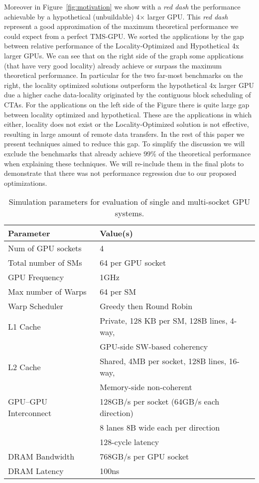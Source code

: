 Moreover in Figure~\ref{fig:motivation} we show with a \emph{red dash} the 
performance achievable by a hypothetical (unbuildable) 4$\times$ larger GPU. 
This \emph{red dash} represent a good approximation of the maximum 
theoretical performance we could expect from a perfect TMS-GPU. We sorted the 
applications by the gap between relative performance of the 
Locality-Optimized and Hypothetical 4x larger GPUs. We can see that on the 
right side of the graph some applications (that have very good locality) 
already achieve or surpass the maximum theoretical performance. In particular 
for the two far-most benchmarks on the right, the locality optimized 
solutions outperform the hypothetical 4x larger GPU due a higher cache 
data-locality originated by the contiguous block scheduling of CTAs. For the 
applications on the left side of the Figure there is quite large gap between 
locality optimized and hypothetical. These are the applications in which 
either, locality does not exist or the Locality-Optimized solution is not 
effective, resulting in large amount of remote data transfers. In the rest of 
this paper we present techniques aimed to reduce this gap. To simplify the 
discussion we will exclude the benchmarks that already achieve 99\% of the 
theoretical performance when explaining these techniques. We will re-include 
them in the final plots to demonstrate that there was not performance 
regression due to our proposed optimizations. 

\begin{table}[tp]
\begin{small}
\centering
\begin{tabular}{ll}
\toprule
\textbf{Parameter} & \textbf{Value(s)} \\
\toprule
Num of GPU sockets & 4 \\
\midrule
Total number of SMs & 64 per GPU socket \\
\midrule
GPU Frequency & 1GHz \\
\midrule
Max number of Warps & 64 per SM \\
\midrule
Warp Scheduler & Greedy then Round Robin \\
\midrule
L1 Cache & Private, 128 KB per SM, 128B lines, 4-way, \\ 
& GPU-side SW-based coherency \\
\midrule
L2 Cache & Shared, 4MB per socket, 128B lines, 16-way, \\ 
& Memory-side non-coherent\\
\midrule
GPU--GPU Interconnect & 128GB/s per socket (64GB/s each direction) \\
& 8 lanes 8B wide each per direction \\
&128-cycle latency \\
\midrule
DRAM Bandwidth & 768GB/s per GPU socket\\
\midrule
DRAM Latency & 100ns \\
\toprule
\end{tabular}
\caption{Simulation parameters for evaluation of single and multi-socket GPU 
systems.}
\label{tab:setup}
\end{small}
\end{table} 
 
